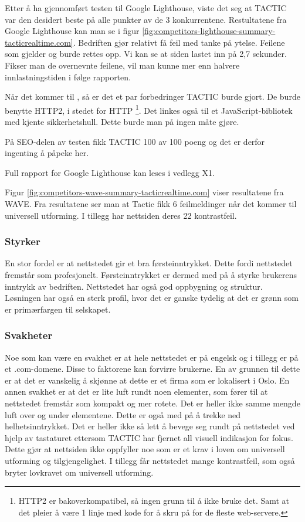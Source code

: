 Etter å ha gjennomført testen til Google Lighthouse, viste det seg at TACTIC var den desidert beste på alle punkter av de 3 konkurrentene. Restultatene fra Google Lighthouse kan man se i figur \ref{fig:competitors-lighthouse-summary-tacticrealtime.com}. Bedriften gjør relativt få feil med tanke på ytelse. Feilene som gjelder  og  burde rettes opp. Vi kan se at siden lastet inn på 2,7 sekunder. Fikser man de overnevnte feilene, vil man kunne mer enn halvere innlastningstiden i følge rapporten.

Når det kommer til , så er det et par forbedringer TACTIC burde gjort. De burde benytte HTTP2, i stedet for HTTP \footnote{HTTP2 er bakoverkompatibel, så ingen grunn til å ikke bruke det. Samt at det pleier å være 1 linje med kode for å skru på for de fleste web-servere.}. Det linkes også til et JavaScript-bibliotek med kjente sikkerhetshull. Dette burde man på ingen måte gjøre.

På SEO-delen av testen fikk TACTIC 100 av 100 poeng og det er derfor ingenting å påpeke her.

Full rapport for Google Lighthouse kan leses i vedlegg X1.

Figur \ref{fig:competitors-wave-summary-tacticrealtime.com} viser resultatene fra WAVE. Fra resultatene ser man at Tactic fikk 6 feilmeldinger når det kommer til universell utforming. I tillegg har nettsiden deres 22 kontrastfeil. 

\subsubsection{Styrker}
En stor fordel er at nettstedet gir et bra førsteinntrykket. Dette fordi nettstedet fremstår som profesjonelt. Førsteinntrykket er dermed med på å styrke brukerens inntrykk av bedriften. Nettstedet har også god oppbygning og struktur. Løsningen har også en sterk profil, hvor det er ganske tydelig at det er grønn som er primærfargen til selskapet.

\subsubsection{Svakheter}
Noe som kan være en svakhet er at hele nettstedet er på engelsk og i tillegg er på et .com-domene. Disse to faktorene kan forvirre brukerne. En av grunnen til dette er at det er vanskelig å skjønne at dette er et firma som er lokalisert i Oslo. En annen svakhet er at det er lite luft rundt noen elementer, som fører til at nettstedet fremstår som kompakt og mer rotete. Det er heller ikke samme mengde luft over og under elementene. Dette er også med på å trekke ned helhetsinntrykket. Det er heller ikke så lett å bevege seg rundt på nettstedet ved hjelp av tastaturet ettersom TACTIC har fjernet all visuell indikasjon for fokus. Dette gjør at nettsiden ikke oppfyller noe som er et krav i loven om universell utforming og tilgjengelighet. I tillegg får nettstedet mange kontrastfeil, som også bryter lovkravet om universell utforming.

